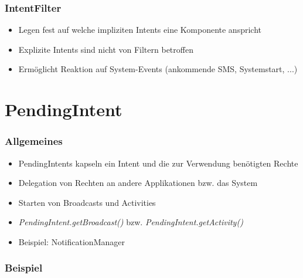 \begin{frame}
   \frametitle{IntentFilter}
   \begin{itemize}
      \item Legen fest auf welche impliziten Intents eine Komponente anspricht
      \item Explizite Intents sind nicht von Filtern betroffen
      \item Ermöglicht Reaktion auf System-Events (ankommende SMS, Systemstart, ...)
   \end{itemize}

   
\end{frame}

\section{PendingIntent}
\begin{frame}
   \frametitle{Allgemeines}
   \begin{itemize}
      \item PendingIntents kapseln ein Intent und die zur Verwendung benötigten Rechte
      \item Delegation von Rechten an andere Applikationen bzw. das System
      \item Starten von Broadcasts und Activities 
      \item \emph{PendingIntent.getBroadcast()} bzw. \emph{PendingIntent.getActivity()} 
      \item Beispiel: NotificationManager
   \end{itemize}
\end{frame}

\begin{frame}
   \frametitle{Beispiel}
	
\end{frame}

